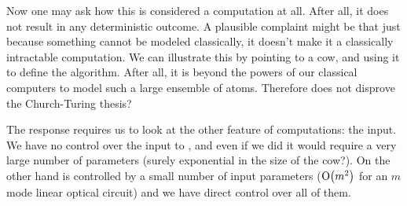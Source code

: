 Now one may ask how this is considered a computation at all.
After all, it does not result in any deterministic outcome. A plausible
complaint might be that just because something cannot be modeled classically,
it doesn't make it a classically intractable computation. We can illustrate
this by pointing to a cow, and using it to define the  algorithm.
After all, it is beyond the powers of our classical computers to model such a
large ensemble of atoms. Therefore does  not disprove the
Church-Turing thesis?

The response requires us to look at the other feature of computations: the
input. We have no control over the input to , and even if we did it
would require a very large number of parameters (surely exponential in the size
of the cow?). On the other hand \bosonsampling{} is controlled by a small number
of input parameters (\(\mathrm{O} \!\left(m^{2}\right)\) for an \(m\) mode linear optical
circuit) and we have direct control over all of them.







